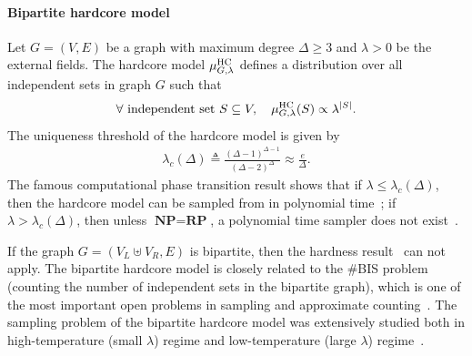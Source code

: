 \documentclass[11pt,a4paper]{article}
\theoremstyle{definition}
\newcommand{\defeq}{\triangleq}
\begin{document}
\paragraph{Bipartite hardcore model}

Let $G=(V,E)$ be a graph with maximum degree $\Delta\geq 3$ and $\lambda>0$ be the external fields.
The hardcore model $\mu^{\textnormal{HC}}_{G,\lambda}$ defines a distribution over all independent sets in graph $G$ such that
\begin{align*}
    \forall \text{ independent set } S \subseteq V, \quad \mu^{\textnormal{HC}}_{G,\lambda}(S)\propto \lambda^{|S|}.
\end{align*}
The uniqueness threshold of the hardcore model is given by
\begin{align*}
\lambda_c(\Delta)\defeq \frac{(\Delta-1)^{\Delta-1}}{(\Delta-2)^\Delta}\approx \frac{e}{\Delta}.
\end{align*}
The famous computational phase transition result shows that if $\lambda \leq \lambda_c(\Delta)$, then the hardcore model can be sampled from in polynomial time~\cite{weitz2006counting,chen2024rapid}; if $\lambda > \lambda_c(\Delta)$, then unless $\textbf{NP} = \textbf{RP}$, a polynomial time sampler does not exist~\cite{Sly10}.

If the graph $G=(V_L \uplus V_R,E)$ is bipartite, then the hardness result~\cite{Sly10} can not apply.
The bipartite hardcore model is closely related to the \#BIS problem (counting the number of independent sets in the bipartite graph), which is one of the most important open problems in sampling and approximate counting~\cite{dyer2004relative}. 
The sampling problem of the bipartite hardcore model was extensively studied both in high-temperature (small $\lambda$) regime \cite{liu2015fptas,Chen0Y23} and low-temperature (large $\lambda$) regime~\cite{HPR20,cannon2020counting,liao2019counting,chen2022sampling,jenssen2023approximate}.
\end{document}
